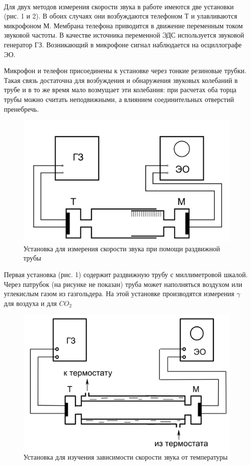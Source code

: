 \documentclass[a4paper,12pt]{article}
\begin{document}
\paragraph{}
Для двух методов измерения скорости звука в работе имеются две установки (рис. 1 и 2). В обоих случаях  они возбуждаются телефоном Т и улавливаются микрофоном М. Мембрана телефона приводится в движение переменным током звуковой частоты. В качестве источника переменной ЭДС используется звуковой генератор ГЗ. Возникающий в микрофоне сигнал наблюдается на осциллографе ЭО.

	Микрофон и телефон присоединены к установке через тонкие резиновые трубки. Такая связь достаточна для возбуждения и обнаружения звуковых колебаний в трубе и в то же время мало возмущает эти колебания: при расчетах оба торца трубы можно считать неподвижными, а влиянием соединительных отверстий пренебречь.



\begin{figure}[h]
\begin{center}
\includegraphics[width=0.6\linewidth]{ustanovka_1.png}
\caption{Установка для измерения скорости звука при помощи раздвижной трубы}
\label{ris:ustanovka_1} 
\end{center}
\end{figure}

	Первая установка (рис. 1) содержит раздвижную трубу с миллиметровой шкалой. Через патрубок (на рисунке не показан) труба может наполняться воздухом или углекислым газом из газгольдера. На этой установке производятся измерения $\gamma$ для воздуха и для $CO_2$


\begin{figure}[h]
\begin{center}
\includegraphics[width=0.6\linewidth]{ustanovka_2.png}
\caption{Установка для изучения зависимости скорости звука от температуры}
\label{ris:ustanovka_2} 
\end{center}
\end{figure}
\end{document}
